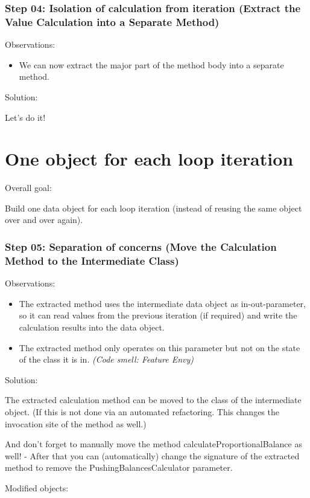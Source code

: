 \documentclass[a4paper,fleqn,titlepage,11pt]{article}
\begin{document}
\section*{Step 04: Isolation of calculation from iteration (Extract the Value Calculation into a Separate Method)}

Observations:
\begin{itemize}
\item We can now extract the major part of the method body into a separate method.
\end{itemize}

Solution:

Let's do it!

\part{One object for each loop iteration}

Overall goal:

Build one data object for each loop iteration (instead of reusing the same object over and over again).


\section*{Step 05: Separation of concerns (Move the Calculation Method to the Intermediate Class)}

Observations:
\begin{itemize}
\item The extracted method uses the intermediate data object as in-out-parameter, so it can read values from the previous iteration (if required) and write the calculation results into the data object.
\item The extracted method only operates on this parameter but not on the state of the class it is in. {\em (Code smell: Feature Envy)}
\end{itemize}

Solution:

The extracted calculation method can be moved to the class of the intermediate object. (If this is not done via an automated refactoring. This changes the invocation site of the method as well.)

And don't forget to manually move the method calculateProportionalBalance as well! - After that you can (automatically) change the signature of the extracted method to remove the PushingBalancesCalculator parameter.

Modified objects:
\end{document}
